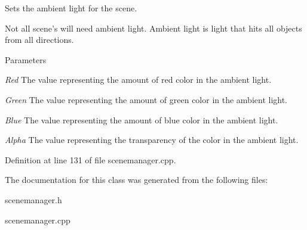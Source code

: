 Sets the ambient light for the scene. 

Not all scene's will need ambient light. Ambient light is light that hits all objects from all directions. 
\begin{DoxyParams}{Parameters}
\item[{\em Red}]The value representing the amount of red color in the ambient light. \item[{\em Green}]The value representing the amount of green color in the ambient light. \item[{\em Blue}]The value representing the amount of blue color in the ambient light. \item[{\em Alpha}]The value representing the transparency of the color in the ambient light. \end{DoxyParams}


Definition at line 131 of file scenemanager.cpp.



The documentation for this class was generated from the following files:\begin{DoxyCompactItemize}
\item 
scenemanager.h\item 
scenemanager.cpp\end{DoxyCompactItemize}
